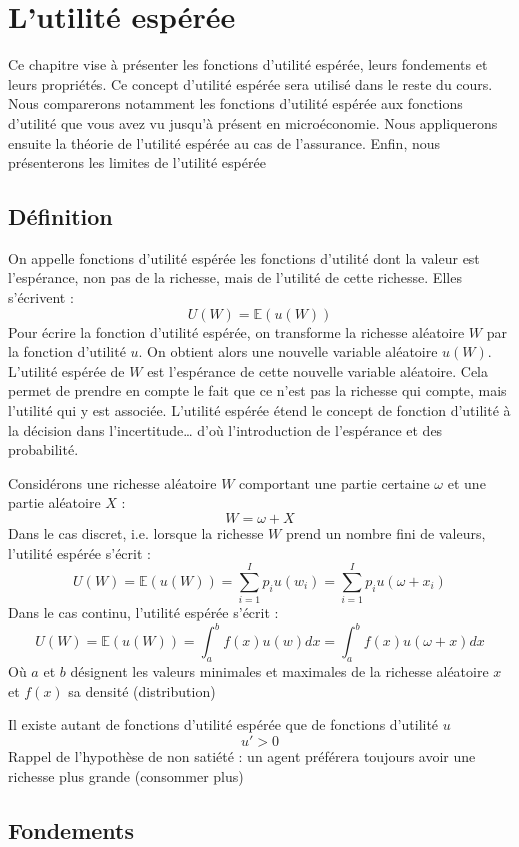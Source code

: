 \documentclass[a4paper, 12pt]{report}
\begin{document}
\chapter{L'utilité espérée}

Ce chapitre vise à présenter les fonctions d'utilité espérée, leurs fondements et leurs propriétés. Ce concept d'utilité espérée sera utilisé dans le reste du cours. Nous comparerons notamment les fonctions d'utilité espérée aux fonctions d'utilité que vous avez vu jusqu'à présent en microéconomie. Nous appliquerons ensuite la théorie de l'utilité espérée au cas de l'assurance. Enfin, nous présenterons les limites de l'utilité espérée

\section{Définition}

On appelle fonctions d'utilité espérée les fonctions d'utilité dont la valeur est l'espérance, non pas de la richesse, mais de l'utilité de cette richesse. Elles s'écrivent :
$$
U(W)=\mathbb{E}\left( u(W)\right) 
$$
Pour écrire la fonction d'utilité espérée, on transforme la richesse aléatoire $W$ par la fonction d'utilité $u$. On obtient alors une nouvelle
variable aléatoire $u(W)$. L'utilité espérée de $W$ est l'espérance de cette nouvelle variable aléatoire. Cela permet de prendre en compte le fait que ce n'est pas la richesse qui compte, mais l'utilité qui y est associée. L'utilité espérée étend le concept de fonction d'utilité à la décision dans l'incertitude… d'où l'introduction de l'espérance et des probabilité. 

Considérons une richesse aléatoire $W$ comportant une partie certaine $\omega$ et une partie aléatoire $X$ :
$$
W=\omega+X
$$
Dans le cas discret, i.e. lorsque la richesse $W$ prend un nombre fini de valeurs, l'utilité espérée s'écrit :
$$
U(W)=\mathbb{E}\left( u(W)\right)=\sum_{i=1}^{I}p_iu(w_i)=\sum_{i=1}^{I}p_iu( \omega+x_i)
$$
Dans le cas continu, l'utilité espérée s'écrit :
$$
U(W)=\mathbb{E}\left( u(W)\right)=\int_{a}^{b}f(x)u(w)dx=\int_{a}^{b}f(x)u(\omega+x)dx
$$
Où $a$ et $b$ désignent les valeurs minimales et maximales de la richesse aléatoire $x$ et $f(x)$ sa densité (distribution)

Il existe autant de fonctions d'utilité espérée que de fonctions d'utilité $u$
$$
u'>0
$$
Rappel de l'hypothèse de non satiété : un agent préférera toujours avoir une richesse plus grande (consommer plus)
\section{Fondements}
\end{document}
